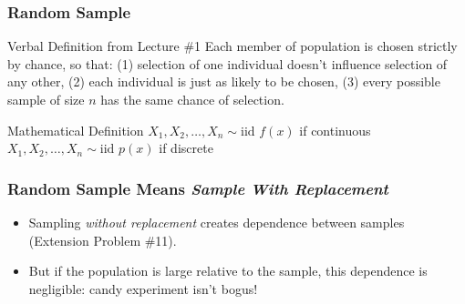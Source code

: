 \begin{frame}
\frametitle{Random Sample}

\begin{block}{Verbal Definition from Lecture \#1}
Each member of population is chosen strictly by chance, so that: (1) selection of one individual doesn't influence selection of any other, (2) each individual is just as likely to be chosen, (3) every possible sample of size $n$ has the same chance of selection.
\end{block}

\begin{alertblock}{Mathematical Definition}
	$X_1, X_2, \hdots, X_n \sim \mbox{iid } f(x)$ if continuous\\
  $X_1, X_2, \hdots, X_n \sim \mbox{iid } p(x)$ if discrete
\end{alertblock}

\end{frame}

\begin{frame}
  \frametitle{Random Sample Means \emph{Sample With Replacement}}


\begin{itemize}
  \item Sampling \emph{without replacement} creates dependence between samples (Extension Problem \#11).
  \item But if the population is large relative to the sample, this dependence is negligible: candy experiment isn't bogus!
\end{itemize}
\end{frame}


